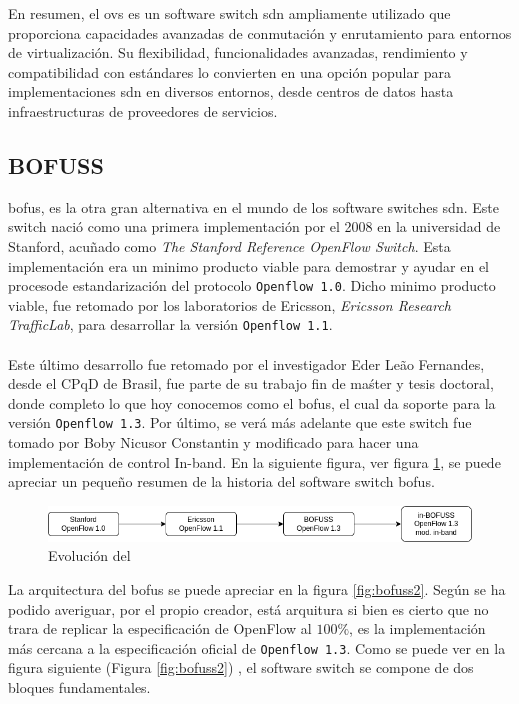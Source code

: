 En resumen, el \gls{ovs} es un software switch \gls{sdn} ampliamente utilizado que proporciona capacidades avanzadas de conmutación y enrutamiento para entornos de virtualización. Su flexibilidad, funcionalidades avanzadas, rendimiento y compatibilidad con estándares lo convierten en una opción popular para implementaciones \gls{sdn} en diversos entornos, desde centros de datos hasta infraestructuras de proveedores de servicios.


\subsection{BOFUSS}
\label{subsec:BOFUSS}

\gls{bofus}, es la otra gran alternativa en el mundo de los software switches \gls{sdn}. Este switch nació como una primera implementación por el 2008 en la universidad de Stanford, acuñado como  \textit{The Stanford Reference OpenFlow Switch}. Esta implementación era un minimo producto viable para demostrar y ayudar en el procesode estandarización del protocolo \texttt{Openflow 1.0}. Dicho minimo producto viable, fue retomado por los laboratorios de Ericsson, \textit{Ericsson Research TrafficLab}, para desarrollar la versión \texttt{Openflow 1.1}. \\
\\
Este último desarrollo fue retomado por el investigador Eder Leão Fernandes, desde el CPqD de Brasil, fue parte de su trabajo fin de maśter y tesis doctoral, donde completo lo que hoy conocemos como el \gls{bofus}, el cual da soporte para la versión \texttt{Openflow 1.3}. Por último, se verá más adelante que este switch fue tomado por Boby Nicusor Constantin y modificado para hacer una implementación de control In-band. En la siguiente figura, ver figura \ref{fig:bofuss1}, se puede apreciar un pequeño resumen de la historia del software switch \gls{bofus}.

\begin{figure}[ht]
    \centering
    \includegraphics[width=\textwidth]{archivos/img/teoria/bofuss1.png}
    \caption{Evolución del }
    \label{fig:bofuss1}
\end{figure}

La arquitectura del \gls{bofus} se puede apreciar en la figura \ref{fig:bofuss2}. Según se ha podido averiguar, por el propio creador, está arquitura si bien es cierto que no trara de replicar la especificación de OpenFlow al $100\%$, es la implementación más cercana a la especificación oficial de \texttt{Openflow 1.3}. Como se puede ver en la figura siguiente (Figura \ref{fig:bofuss2}) , el software switch se compone de dos bloques fundamentales.

